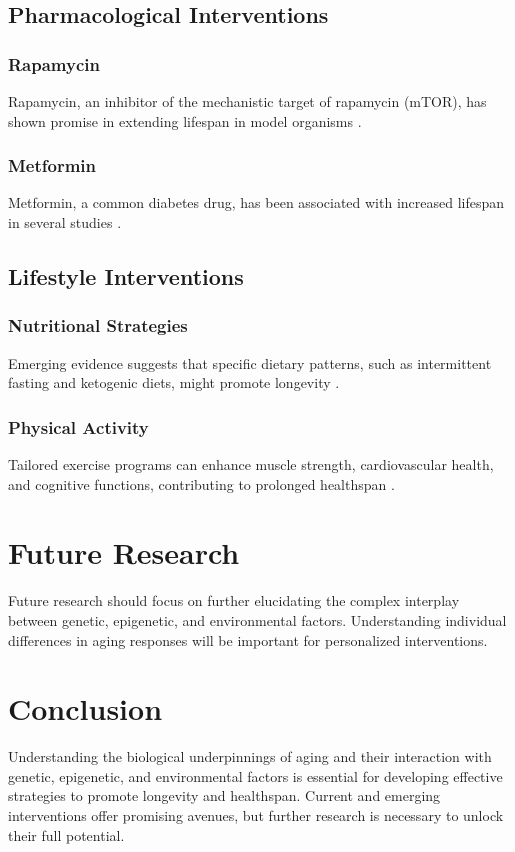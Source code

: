 \documentclass[a4paper,12pt]{article}
\begin{document}
\subsection{Pharmacological Interventions}
\subsubsection{Rapamycin}
Rapamycin, an inhibitor of the mechanistic target of rapamycin (mTOR), has shown promise in extending lifespan in model organisms \cite{soukas2019kathrin}.

\subsubsection{Metformin}
Metformin, a common diabetes drug, has been associated with increased lifespan in several studies \cite{barzilai2016metformin}.

\subsection{Lifestyle Interventions}
\subsubsection{Nutritional Strategies}
Emerging evidence suggests that specific dietary patterns, such as intermittent fasting and ketogenic diets, might promote longevity \cite{longo2015fasting}.

\subsubsection{Physical Activity}
Tailored exercise programs can enhance muscle strength, cardiovascular health, and cognitive functions, contributing to prolonged healthspan \cite{hawkins2010exercise}.

\section{Future Research}
Future research should focus on further elucidating the complex interplay between genetic, epigenetic, and environmental factors. Understanding individual differences in aging responses will be important for personalized interventions.

\section{Conclusion}
Understanding the biological underpinnings of aging and their interaction with genetic, epigenetic, and environmental factors is essential for developing effective strategies to promote longevity and healthspan. Current and emerging interventions offer promising avenues, but further research is necessary to unlock their full potential.


\end{document}
